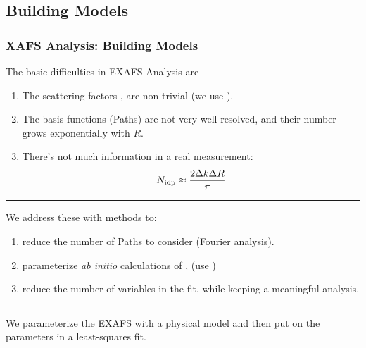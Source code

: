 \subsection{Building Models}
\begin{frame}
 \frametitle{XAFS Analysis: Building Models }

  The basic difficulties in  EXAFS Analysis are

  \begin{enumerate}

  \item The scattering factors ,  are
    non-trivial (we use {\feff}).

 \item The basis functions (Paths) are not very well resolved, and their
    number grows exponentially with $R$.

  \item There's not much information in a real measurement:
    \[ N_{\rm idp} \approx \frac{2\Delta k\Delta R}{\pi} \]

  \end{enumerate}

    \hrule \vmm \pause

    We address these with methods to:

    \begin{enumerate}
    \item {reduce} the number of Paths to consider (Fourier analysis).

    \item parameterize {\emph{ab initio}} calculations of
      ,  (use {\feff})

    \item reduce the number of  variables in the fit, while keeping a
      meaningful analysis.

    \end{enumerate}

    \hrule \vmm

    We parameterize the EXAFS with a physical model and then
    put {} on the  %
    parameters in a least-squares fit.

    \vmm
\end{frame}


